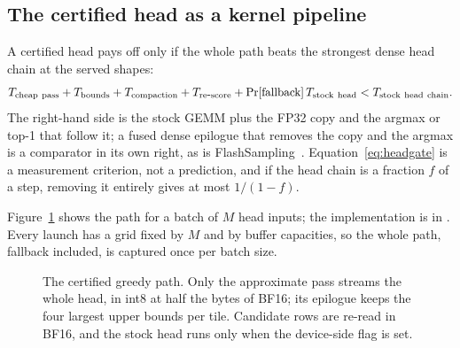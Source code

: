 \subsection{The certified head as a kernel pipeline}\label{sec:kernel-design}
A certified head pays off only if the whole path beats the strongest dense head chain at the served shapes:
\begin{equation}
T_{\rm cheap\ pass}+T_{\rm bounds}+T_{\rm compaction}+T_{\rm re\mbox{-}score}+\Pr[\text{fallback}]\,T_{\rm stock\ head}<T_{\rm stock\ head\ chain}.\label{eq:headgate}
\end{equation}
The right-hand side is the stock GEMM plus the FP32 copy and the argmax or top-1 that follow it; a fused dense epilogue that removes the copy and the argmax is a comparator in its own right, as is FlashSampling~\cite{flashsampling}. Equation~\eqref{eq:headgate} is a measurement criterion, not a prediction, and if the head chain is a fraction $f$ of a step, removing it entirely gives at most $1/(1-f)$.

Figure~\ref{fig:kernel-path} shows the path for a batch of $M$ head inputs; the implementation is in  . Every launch has a grid fixed by $M$ and by buffer capacities, so the whole path, fallback included, is captured once per batch size.

\begin{figure}[tbp]
\centering
{}
\caption{The certified greedy path. Only the approximate pass streams the whole head, in int8 at half the bytes of BF16; its epilogue keeps the four largest upper bounds per tile. Candidate rows are re-read in BF16, and the stock head runs only when the device-side flag is set.}
\label{fig:kernel-path}
\end{figure}

